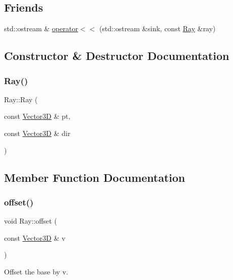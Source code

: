 \subsection*{Friends}
\begin{DoxyCompactItemize}
\item 
std\+::ostream \& \mbox{\hyperlink{classRay_a419823895c7cde830e4b34018dec9c2f}{operator$<$$<$}} (std\+::ostream \&sink, const \mbox{\hyperlink{classRay}{Ray}} \&ray)
\end{DoxyCompactItemize}


\subsection{Constructor \& Destructor Documentation}
\mbox{\label{classRay_a9fad894cf932e40e035eb93ed880577b}} 
\subsubsection{\texorpdfstring{Ray()}{Ray()}}
{\footnotesize\ttfamily Ray\+::\+Ray (\begin{DoxyParamCaption}\item[{const \mbox{\hyperlink{classVector3D}{Vector3D}} \&}]{pt,  }\item[{const \mbox{\hyperlink{classVector3D}{Vector3D}} \&}]{dir }\end{DoxyParamCaption})}



\subsection{Member Function Documentation}
\mbox{\label{classRay_ab5669d08ac75473d52cb4e0ade79b6c1}} 
\subsubsection{\texorpdfstring{offset()}{offset()}}
{\footnotesize\ttfamily void Ray\+::offset (\begin{DoxyParamCaption}\item[{const \mbox{\hyperlink{classVector3D}{Vector3D}} \&}]{v }\end{DoxyParamCaption})}



Offset the base by v. 


